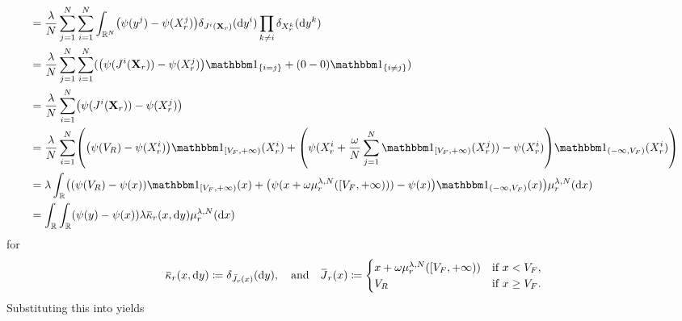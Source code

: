 \documentclass{article}
\begin{document}
\begin{equation}
\begin{split}
     & = \frac{\lambda}{N} \sum_{j=1}^N \sum_{i=1}^N \int_{\potspace^N} \br*{ \psi(y^j) - \psi(X_{r}^j) } \delta_{\jtarg^i(\bm{X}_r)}(\odif{y^i}) \prod_{k \neq i} \delta_{X_r^k}(\odif{y^k}) \\
     & = \frac{\lambda}{N} \sum_{j=1}^N \sum_{i=1}^N \br{ \br*{ \psi(\jtarg^i(\bm{X}_r)) - \psi(X_{r}^j) } \ind{i = j} + (0 - 0) \ind{i \neq j} }                                             \\
     & = \frac{\lambda}{N} \sum_{i=1}^N \br*{ \psi(\jtarg^i(\bm{X}_r)) - \psi(X_{r}^j) }                                                                                                      \\
     & = \frac{\lambda}{N} \sum_{i=1}^N \br*{ \br*{ \psi(V_R) - \psi(X_{r}^i) } \indE{[V_F,+\infty)}(X_{r}^i)
    + \br*{ \psi(X_{r}^i + \frac{\omega}{N} \sum_{j=1}^N \indE{[V_F,+\infty)}(X_{r}^j)) - \psi(X_{r}^i) } \indE{(-\infty,V_F)}(X_{r}^i) }                                                     \\
     & = \lambda \int_\potspace \br*{ \br*{ \psi(V_R) - \psi(x) } \indE{[V_F,+\infty)}(x)
    + \br*{ \psi(x + \omega \mu_r^{\lambda, N}([V_F,+\infty))) - \psi(x) } \indE{(-\infty,V_F)}(x) } \mu_{r}^{\lambda, N}(\odif{x})                                                           \\
     & = \int_\potspace \int_\potspace (\psi(y) - \psi(x)) \lambda \ol{\kappa}_r(x, \odif{y}) \mu_{r}^{\lambda, N}(\odif{x})
  \end{split}
\end{equation}
for
\begin{equation}
  \ol{\kappa}_r(x, \odif{y}) \coloneqq \delta_{\bar{\jtarg}_r(x)}(\odif{y}),
  \quad\text{and}\quad
  \ol{\jtarg}_r(x) \coloneqq \begin{cases}
    x + \omega \mu_r^{\lambda, N}([V_F,+\infty)) & \text{if } x < V_F,    \\
    V_R                                          & \text{if } x \geq V_F.
  \end{cases}
\end{equation}
Substituting this into  yields
\end{document}
